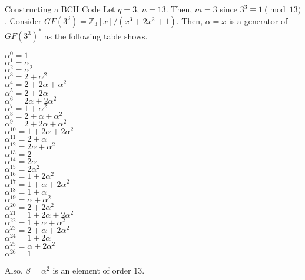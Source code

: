 \begin{Example}{Constructing a BCH Code}{}
    Let $ q=3 $, $ n=13 $. Then, $ m=3 $ since $ 3^3\equiv 1\pmod{13} $.
    Consider $ GF(3^3)=\mathbb{Z}_3[x]/(x^3+2x^2+1) $.
    Then, $ \alpha=x $ is a generator of $ GF(3^3)^* $
    as the following table shows.
    \begin{center}
        \begin{multicols}{3}
            $ \alpha^0=1 $ \\
            $ \alpha^1=\alpha $\\
            $ \alpha^2=\alpha^2 $\\
            $ \alpha^3=2+\alpha^2 $\\
            $ \alpha^4=2+2\alpha+\alpha^2 $\\
            $ \alpha^5=2+2\alpha $\\
            $ \alpha^6=2\alpha+2\alpha^2 $\\
            $ \alpha^7=1+\alpha^2 $\\
            $ \alpha^8=2+\alpha+\alpha^2 $\\
            $ \alpha^9=2+2\alpha+\alpha^2 $\\
            $ \alpha^{10}=1+2\alpha+2\alpha^2 $\\
            $ \alpha^{11}=2+\alpha $\\
            $ \alpha^{12}=2\alpha+\alpha^2 $\\
            $ \alpha^{13}=2 $\\
            $ \alpha^{14}=2\alpha $\\
            $ \alpha^{15}=2\alpha^2 $\\
            $ \alpha^{16}=1+2\alpha^2 $\\
            $ \alpha^{17}=1+\alpha+2\alpha^2 $\\
            $ \alpha^{18}=1+\alpha  $\\
            $ \alpha^{19}=\alpha+\alpha^2 $\\
            $ \alpha^{20}=2+2\alpha^2 $\\
            $ \alpha^{21}=1+2\alpha+2\alpha^2 $\\
            $ \alpha^{22}=1+\alpha+\alpha^2 $\\
            $ \alpha^{23}=2+\alpha+2\alpha^2 $\\
            $ \alpha^{24}=1+2\alpha $\\
            $ \alpha^{25}=\alpha+2\alpha^{2} $\\
            $ \alpha^{26}=1 $
        \end{multicols}
    \end{center}
    Also, $ \beta=\alpha^2 $ is an element of order $ 13 $.


\end{Example}
